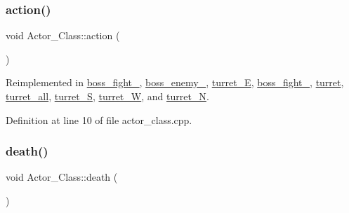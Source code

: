\subsubsection{\texorpdfstring{action()}{action()}}
{\footnotesize\ttfamily void Actor\+\_\+\+Class\+::action (\begin{DoxyParamCaption}{ }\end{DoxyParamCaption})\hspace{0.3cm}{\ttfamily [virtual]}}



Reimplemented in \hyperlink{classboss__fight__3_adfe8a4ff5e97513348411aa89a91e68c}{boss\+\_\+fight\+\_}, \hyperlink{classboss__enemy__2_a6315561045c1530e588014caaf6a9292}{boss\+\_\+enemy\+\_}, \hyperlink{classturret___e_ae171d53d23f25be7b0e76360803b2cf4}{turret\+\_\+E}, \hyperlink{classboss__fight__1_a73c37c9ddf1b6370d1a9e2b5c9cd9b05}{boss\+\_\+fight\+\_}, \hyperlink{classturret_a883048366044ccc7abd00a7f57400d2a}{turret}, \hyperlink{classturret__all_a448418831d26b665611848751d6294b6}{turret\+\_\+all}, \hyperlink{classturret___s_a34ce31ab5648dab8b5cfb7c94d96cf3a}{turret\+\_\+S}, \hyperlink{classturret___w_a7cc0215ea12db8e371f02e377a5556f9}{turret\+\_\+W}, and \hyperlink{classturret___n_a888cc034380c572a17a38e0f3c2fb9bd}{turret\+\_\+N}.



Definition at line 10 of file actor\+\_\+class.\+cpp.

\hypertarget{class_actor___class_a9447c6154a674d7e6bdf24ff2874b7a8}{}\label{class_actor___class_a9447c6154a674d7e6bdf24ff2874b7a8} 
\subsubsection{\texorpdfstring{death()}{death()}}
{\footnotesize\ttfamily void Actor\+\_\+\+Class\+::death (\begin{DoxyParamCaption}{ }\end{DoxyParamCaption})\hspace{0.3cm}{\ttfamily [virtual]}}



